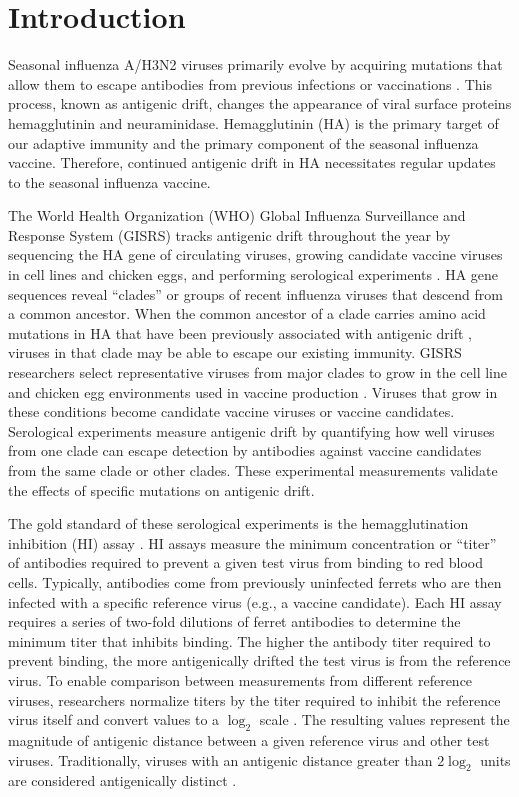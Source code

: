 \documentclass[utf8]{FrontiersinHarvard} %
\begin{document}
\section{Introduction}

Seasonal influenza A/H3N2 viruses primarily evolve by acquiring mutations that allow them to escape antibodies from previous infections or vaccinations \citep{Petrova2018}.
This process, known as antigenic drift, changes the appearance of viral surface proteins hemagglutinin and neuraminidase.
Hemagglutinin (HA) is the primary target of our adaptive immunity and the primary component of the seasonal influenza vaccine.
Therefore, continued antigenic drift in HA necessitates regular updates to the seasonal influenza vaccine.

The World Health Organization (WHO) Global Influenza Surveillance and Response System (GISRS) tracks antigenic drift throughout the year by sequencing the HA gene of circulating viruses, growing candidate vaccine viruses in cell lines and chicken eggs, and performing serological experiments \citep{Morris:2017ea}.
HA gene sequences reveal ``clades'' or groups of recent influenza viruses that descend from a common ancestor.
When the common ancestor of a clade carries amino acid mutations in HA that have been previously associated with antigenic drift \citep{Wolf:2006da,Shih:2007bd,Koel:2013jz}, viruses in that clade may be able to escape our existing immunity.
GISRS researchers select representative viruses from major clades to grow in the cell line and chicken egg environments used in vaccine production \citep{Katz2011}.
Viruses that grow in these conditions become candidate vaccine viruses or vaccine candidates.
Serological experiments measure antigenic drift by quantifying how well viruses from one clade can escape detection by antibodies against vaccine candidates from the same clade or other clades.
These experimental measurements validate the effects of specific mutations on antigenic drift.

The gold standard of these serological experiments is the hemagglutination inhibition (HI) assay \citep{hirst1943studies}.
HI assays measure the minimum concentration or ``titer'' of antibodies required to prevent a given test virus from binding to red blood cells.
Typically, antibodies come from previously uninfected ferrets who are then infected with a specific reference virus (e.g., a vaccine candidate).
Each HI assay requires a series of two-fold dilutions of ferret antibodies to determine the minimum titer that inhibits binding.
The higher the antibody titer required to prevent binding, the more antigenically drifted the test virus is from the reference virus.
To enable comparison between measurements from different reference viruses, researchers normalize titers by the titer required to inhibit the reference virus itself and convert values to a $\log_{2}$ scale \citep{Smith:2004jc,Bedford:2014bf,Neher:2016hy}.
The resulting values represent the magnitude of antigenic distance between a given reference virus and other test viruses.
Traditionally, viruses with an antigenic distance greater than $2\log_{2}$ units are considered antigenically distinct \citep{Katz2011}.
\end{document}
